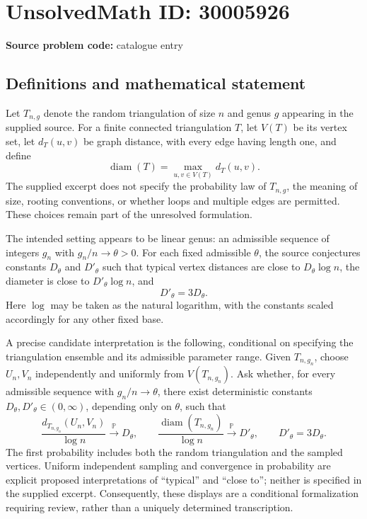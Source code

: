 \documentclass[11pt]{article}
\begin{document}
\section*{UnsolvedMath ID: 30005926}
\textbf{Source problem code:} catalogue entry
\subsection{Definitions and mathematical statement}
Let \(T_{n,g}\) denote the random triangulation of size \(n\) and genus \(g\) appearing in the supplied source. For a finite connected triangulation \(T\), let \(V(T)\) be its vertex set, let \(d_T(u,v)\) be graph distance, with every edge having length one, and define
\[
\operatorname{diam}(T)=\max_{u,v\in V(T)}d_T(u,v).
\]
The supplied excerpt does not specify the probability law of \(T_{n,g}\), the meaning of size, rooting conventions, or whether loops and multiple edges are permitted. These choices remain part of the unresolved formulation.

The intended setting appears to be linear genus: an admissible sequence of integers \(g_n\) with \(g_n/n\to\theta>0\). For each fixed admissible \(\theta\), the source conjectures constants \(D_\theta\) and \(D'_\theta\) such that typical vertex distances are close to \(D_\theta\log n\), the diameter is close to \(D'_\theta\log n\), and
\[
D'_\theta=3D_\theta.
\]
Here \(\log\) may be taken as the natural logarithm, with the constants scaled accordingly for any other fixed base.

A precise candidate interpretation is the following, conditional on specifying the triangulation ensemble and its admissible parameter range. Given \(T_{n,g_n}\), choose \(U_n,V_n\) independently and uniformly from \(V(T_{n,g_n})\). Ask whether, for every admissible sequence with \(g_n/n\to\theta\), there exist deterministic constants \(D_\theta,D'_\theta\in(0,\infty)\), depending only on \(\theta\), such that
\[
\frac{d_{T_{n,g_n}}(U_n,V_n)}{\log n}\xrightarrow{\mathbb P}D_\theta,
\qquad
\frac{\operatorname{diam}(T_{n,g_n})}{\log n}\xrightarrow{\mathbb P}D'_\theta,
\qquad D'_\theta=3D_\theta.
\]
The first probability includes both the random triangulation and the sampled vertices. Uniform independent sampling and convergence in probability are explicit proposed interpretations of ``typical'' and ``close to''; neither is specified in the supplied excerpt. Consequently, these displays are a conditional formalization requiring review, rather than a uniquely determined transcription.
\end{document}
